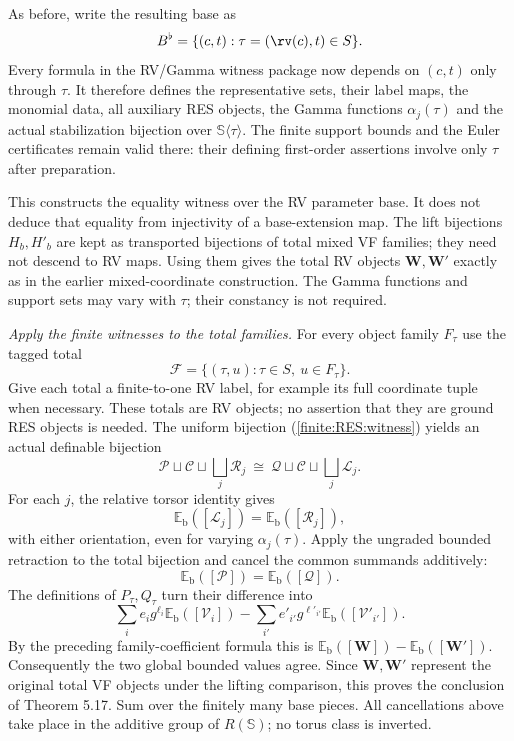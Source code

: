 As before, write the resulting base as
\[
 B^\flat=\{(c,t):\tau=(\rv(c),t)\in S\}.
\]
Every formula in the RV/Gamma witness package now depends
on $(c,t)$ only through $\tau$.
It therefore defines the representative sets, their label
maps, the monomial data, all auxiliary RES objects,
the Gamma functions $\alpha_j(\tau)$ and the actual
stabilization bijection over $\mathbb S\langle\tau\rangle$.
The finite support bounds and the Euler certificates remain
valid there: their defining first-order assertions involve
only $\tau$ after preparation.

This constructs the equality witness over the RV parameter
base. It does not deduce that equality from injectivity of
a base-extension map.
The lift bijections $H_b,H'_b$ are kept as transported
bijections of total mixed VF families; they need not
descend to RV maps.
Using them gives the total RV objects
$\bm W,\bm W'$ exactly as in the earlier mixed-coordinate
construction.
The Gamma functions and support sets may vary with
$\tau$; their constancy is not required.

\medskip
\noindent\emph{Apply the finite witnesses to the total families.}
For every object family $F_\tau$ use the tagged total
\[
 \mathcal F=\{(\tau,u):\tau\in S,\ u\in F_\tau\}.
\]
Give each total a finite-to-one RV label, for example its
full coordinate tuple when necessary.
These totals are RV objects; no assertion that they are
ground RES objects is needed.
The uniform bijection (\ref{finite:RES:witness}) yields
an actual definable bijection
\[
 \mathcal P\sqcup\mathcal C\sqcup\bigsqcup_j\mathcal R_j
       \ \cong\
 \mathcal Q\sqcup\mathcal C\sqcup\bigsqcup_j\mathcal L_j .
\]
For each $j$, the relative torsor identity gives
\[
 \mathbb E_{\mathrm b}([\mathcal L_j])
       =\mathbb E_{\mathrm b}([\mathcal R_j]),
\]
with either orientation, even for varying
$\alpha_j(\tau)$.
Apply the ungraded bounded retraction to the total
bijection and cancel the common summands additively:
\[
 \mathbb E_{\mathrm b}([\mathcal P])
       =\mathbb E_{\mathrm b}([\mathcal Q]).
\]
The definitions of $P_\tau,Q_\tau$ turn their difference
into
\[
 \sum_i e_i g^{\ell_i}\mathbb E_{\mathrm b}([\mathcal V_i])
   -\sum_{i'}e'_{i'}g^{\ell'_{i'}}
                   \mathbb E_{\mathrm b}([\mathcal V'_{i'}]).
\]
By the preceding family-coefficient formula this is
$\mathbb E_{\mathrm b}([\bm W])
 -\mathbb E_{\mathrm b}([\bm W'])$.
Consequently the two global bounded values agree.
Since $\bm W,\bm W'$ represent the original total
VF objects under the lifting comparison, this proves
the conclusion of Theorem 5.17.
Sum over the finitely many base pieces.
All cancellations above take place in the additive
group of $R(\mathbb S)$; no torus class is inverted.
